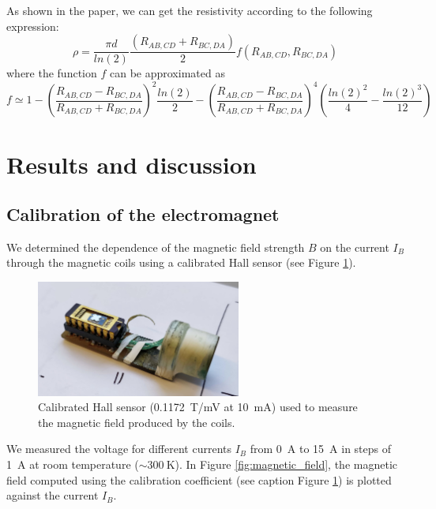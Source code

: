 \documentclass[11pt,a4paper]{article}
\begin{document}
As shown in the paper, we can get the resistivity according to the following expression:
\begin{equation}
\rho=\frac{\pi d}{ln(2)}\frac{(R_{AB,CD}+R_{BC,DA})}{2}f\left(R_{AB,CD},R_{BC,DA}\right)
\end{equation}
where the function $f$ can be approximated as
\begin{equation}
f \simeq 1-\left(\frac{R_{AB,CD}-R_{BC,DA}}{R_{AB,CD}+R_{BC,DA}}\right)^2 \frac{ln(2)}{2}-\left(\frac{R_{AB,CD}-R_{BC,DA}}{R_{AB,CD}+R_{BC,DA}}\right)^4\left(\frac{ln(2)^2}{4}-\frac{ln(2)^3}{12}\right)
\end{equation}

\section{Results and discussion}

\subsection{Calibration of the electromagnet}

We determined the dependence of the magnetic field strength $B$ on the current $I_B$ through the magnetic coils using a calibrated Hall sensor (see Figure \ref{fig:Hall_sensor}).

\begin{figure}[ht]
\centering
\includegraphics[width=0.6\textwidth]{Hall_sensor}
\caption{Calibrated Hall sensor (\SI{0.1172}{\tesla/\milli\volt} at \SI{10}{\milli\ampere}) used to measure the magnetic field produced by the coils.}
\label{fig:Hall_sensor}
\end{figure}

We measured the voltage for different currents $I_B$ from \SI{0}{\ampere} to \SI{15}{\ampere} in steps of \SI{1}{\ampere} at room temperature ($\sim\SI{300}{\kelvin}$). In Figure \ref{fig:magnetic_field}, the magnetic field computed using the calibration coefficient (see caption Figure \ref{fig:Hall_sensor}) is plotted against the current $I_B$.
\end{document}
